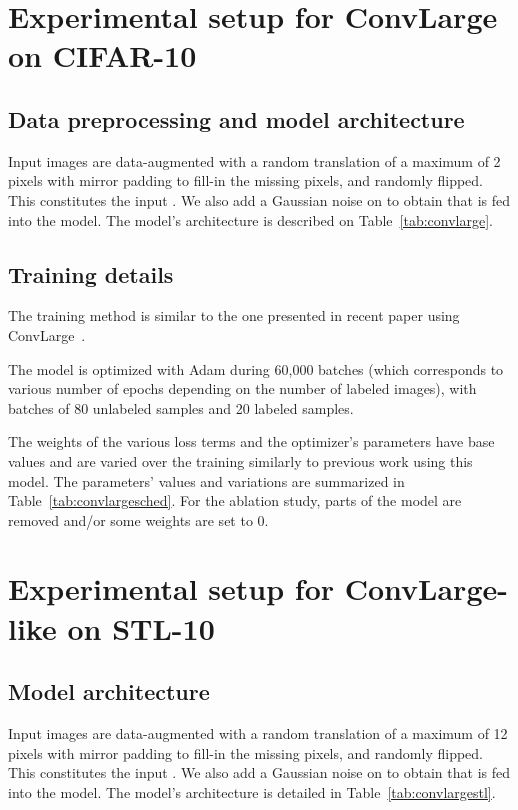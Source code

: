 \documentclass[runningheads]{llncs}
\begin{document}
\FloatBarrier

\section{Experimental setup for ConvLarge on CIFAR-10}
\subsection{Data preprocessing and model architecture}

Input images are data-augmented with a random translation of a maximum of 2 pixels with mirror padding to fill-in the missing pixels, and randomly flipped. This constitutes the input . We also add a Gaussian noise on   to obtain  that is fed into the model.
The model's architecture is described on Table~\ref{tab:convlarge}.

\subsection{Training details}

The training method is similar to the one presented in recent paper using Conv\-Large~\cite{Sajjadi2016,Laine2016,Tarvainen2017}.

The model is optimized with Adam during 60,000 batches (which corresponds to various number of epochs depending on the number of labeled images), with batches of 80 unlabeled samples and 20 labeled samples.

The weights of the various loss terms and the optimizer's parameters have base values and are varied over the training similarly to previous work using this model. The parameters' values and variations are summarized in Table~\ref{tab:convlargesched}. For the ablation study, parts of the model are removed and/or some weights are set to 0.


\section{Experimental setup for ConvLarge-like on STL-10}
\subsection{Model architecture}

Input images are data-augmented with a random translation of a maximum of 12 pixels with mirror padding to fill-in the missing pixels, and randomly flipped. This constitutes the input . We also add a Gaussian noise on   to obtain  that is fed into the model.
The model's architecture is detailed in Table~\ref{tab:convlargestl}.
\end{document}

